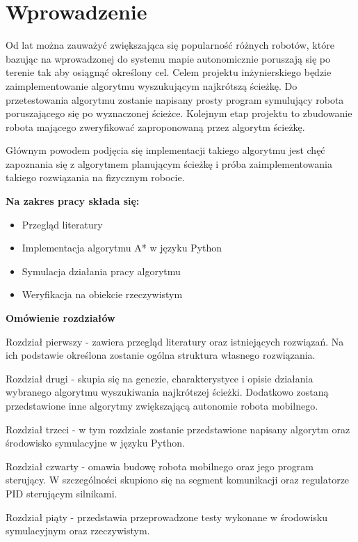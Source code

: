 \section{Wprowadzenie}
Od lat można zauważyć zwiększająca się popularność różnych robotów, które bazując na wprowadzonej do systemu mapie
autonomicznie poruszają się po terenie tak aby osiągnąć określony cel.
Celem projektu inżynierskiego będzie zaimplementowanie algorytmu wyszukującym najkrótszą ścieżkę.
Do przetestowania algorytmu zostanie napisany prosty program symulujący robota poruszającego się po wyznaczonej ścieżce.
Kolejnym etap projektu to zbudowanie robota mającego zweryfikować zaproponowaną przez algorytm ścieżkę. 

Głównym powodem podjęcia się implementacji takiego algorytmu jest chęć zapoznania się z algorytmem planującym ścieżkę
i próba zaimplementowania takiego rozwiązania na fizycznym robocie.


\textbf{Na zakres pracy składa się:}
\begin{itemize}
	\item Przegląd literatury
	\item Implementacja algorytmu A* w języku Python
	\item Symulacja działania pracy algorytmu
	\item Weryfikacja na obiekcie rzeczywistym
\end{itemize}

\textbf{Omówienie rozdziałów}

Rozdział pierwszy - zawiera przegląd literatury oraz istniejących rozwiązań. 
Na ich podstawie określona zostanie ogólna struktura własnego rozwiązania.

Rozdział drugi - skupia się na genezie, charakterystyce i opisie działania wybranego algorytmu wyszukiwania najkrótszej ścieżki.
Dodatkowo zostaną przedstawione inne algorytmy zwiększającą autonomie robota mobilnego.

Rozdział trzeci - w tym rozdziale zostanie przedstawione napisany algorytm oraz środowisko symulacyjne w języku Python.

Rozdział czwarty - omawia budowę robota mobilnego oraz jego program sterujący.
W szczególności skupiono się na segment komunikacji oraz regulatorze PID sterującym silnikami.

Rozdział piąty - przedstawia przeprowadzone testy wykonane w środowisku symulacyjnym oraz rzeczywistym. 